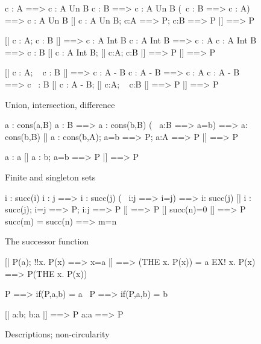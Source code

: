 \begin{figure}
\begin{ttbox}
         c : A ==> c : A Un B
         c : B ==> c : A Un B
         (~c : B ==> c : A) ==> c : A Un B
          [| c : A Un B;  c:A ==> P;  c:B ==> P |] ==> P

         [| c : A;  c : B |] ==> c : A Int B
        c : A Int B ==> c : A
        c : A Int B ==> c : B
         [| c : A Int B;  [| c:A; c:B |] ==> P |] ==> P

        [| c : A;  ~ c : B |] ==> c : A - B
       c : A - B ==> c : A
       c : A - B ==> c ~: B
        [| c : A - B;  [| c:A; ~ c:B |] ==> P |] ==> P
\end{ttbox}
\caption{Union, intersection, difference} \label{zf-Un}
\end{figure}


\begin{figure}
\begin{ttbox}
       a : cons(a,B)
       a : B ==> a : cons(b,B)
       (~ a:B ==> a=b) ==> a: cons(b,B)
        [| a : cons(b,A);  a=b ==> P;  a:A ==> P |] ==> P

   a : {\ttlbrace}a{\ttrbrace}
   [| a : {\ttlbrace}b{\ttrbrace}; a=b ==> P |] ==> P
\end{ttbox}
\caption{Finite and singleton sets} \label{zf-upair2}
\end{figure}


\begin{figure}
\begin{ttbox}
       i : succ(i)
       i : j ==> i : succ(j)
       (~ i:j ==> i=j) ==> i: succ(j)
        [| i : succ(j);  i=j ==> P;  i:j ==> P |] ==> P
   [| succ(n)=0 |] ==> P
  succ(m) = succ(n) ==> m=n
\end{ttbox}
\caption{The successor function} \label{zf-succ}
\end{figure}


\begin{figure}
\begin{ttbox}
     [| P(a);  !!x. P(x) ==> x=a |] ==> (THE x. P(x)) = a
             EX! x. P(x) ==> P(THE x. P(x))

              P ==> if(P,a,b) = a
         ~P ==> if(P,a,b) = b

         [| a:b;  b:a |] ==> P
       a:a ==> P
\end{ttbox}
\caption{Descriptions; non-circularity} \label{zf-the}
\end{figure}


